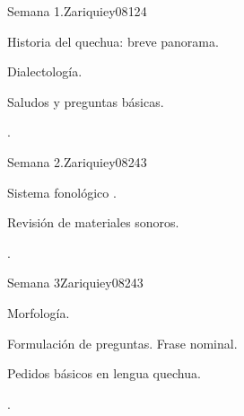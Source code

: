 \begin{syllabus}
\begin{competences}
    \item {}
    \item {}
    \item {}
    \item {}
\end{competences}

\begin{unit}{}{Semana 1.}{Zariquiey08}{12}{4}
   \begin{topics}
      \item Historia del quechua: breve panorama.
      \item Dialectología.
      \item Saludos y preguntas básicas.
   \end{topics}

   \begin{learningoutcomes}
      \item .
   \end{learningoutcomes}
\end{unit}

\begin{unit}{}{Semana 2.}{Zariquiey08}{24}{3}
   \begin{topics}
      \item Sistema fonológico .
      \item Revisión de materiales sonoros.
   \end{topics}

   \begin{learningoutcomes}
      \item . 
      \end{learningoutcomes}
\end{unit}

\begin{unit}{}{Semana 3}{Zariquiey08}{24}{3}
   \begin{topics}
      \item Morfología.
      \item Formulación de preguntas. Frase nominal.
      \item Pedidos básicos en lengua quechua.
   \end{topics}

   \begin{learningoutcomes}
      \item .
     
   \end{learningoutcomes}
\end{unit}


\end{syllabus}
